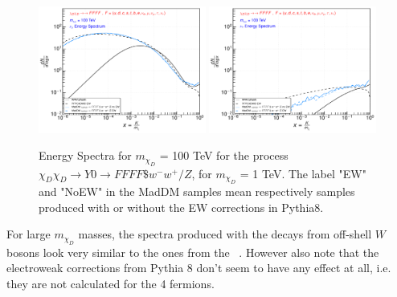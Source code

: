 \documentclass[epj,nopacs,fleqn]{svjour}
\begin{document}
\begin{figure}[!b]
\subfigure
{ \includegraphics[width=0.49\textwidth]{Fig/xdxd_FFFF_WZ/100_neutrinos_mu_FFFF_100.pdf}}
\subfigure
{ \includegraphics[width=0.49\textwidth]{Fig/xdxd_FFFF_WZ/100_neutrinos_tau_FFFF_100.pdf}}
\caption{Energy Spectra for $m_{\chi_D}$ = 100 TeV for the process $\chi_D \chi_D \rightarrow Y0 \rightarrow FFFF \$w^- w^+ /Z $, for $m_{\chi_D}$ = 1 TeV. The label "EW" and "NoEW" in the MadDM samples mean respectively samples produced with or without the EW corrections in Pythia8.}
\label{woff_100}
\end{figure}

For large $m_{\chi_D}$ masses, the spectra produced with the decays from off-shell $W$ bosons look very similar to the ones from the \PPPCew~. However also note that the electroweak corrections from Pythia 8 don't seem to have any effect at all, i.e. they are not calculated for the 4 fermions. 



\clearpage
\end{document}
